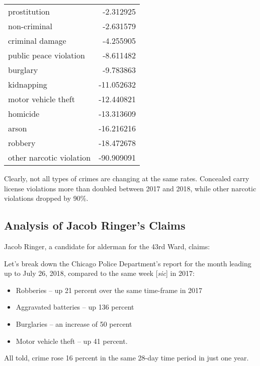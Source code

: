 \documentclass[11pt]{article}
\begin{document}
\begin{table}[H]
\begin{tabular}{l|r}
prostitution &   -2.312925 \\
non-criminal &   -2.631579 \\
criminal damage &   -4.255905 \\
public peace violation &   -8.611482 \\
burglary &   -9.783863 \\
kidnapping &  -11.052632 \\
motor vehicle theft &  -12.440821 \\
homicide &  -13.313609 \\
arson &  -16.216216 \\
robbery &  -18.472678 \\
other narcotic violation &  -90.909091 \\
\end{tabular}
\end{table}
Clearly, not all types of crimes are changing at the same rates. Concealed carry license violations more than doubled between 2017 and 2018, while other narcotic violations dropped by 90\%.
\pagebreak
\subsection{Analysis of Jacob Ringer's Claims}
Jacob Ringer, a candidate for alderman for the 43rd Ward, claims: 

\begin{mdframed}[topline=false, bottomline=false, rightline=false,linewidth=2pt,linecolor=gray]
Let's break down the Chicago Police Department's report for the month leading up to July 26, 2018, compared to the same week [\textit{sic}] in 2017:
\begin{itemize}
\item Robberies -- up 21 percent over the same time-frame in 2017
\item Aggravated batteries -- up 136 percent
\item Burglaries -- an increase of 50 percent
\item Motor vehicle theft -- up 41 percent.
\end{itemize}
All told, crime rose 16 percent in the same 28-day time period in just one year.
\end{mdframed}
\end{document}

